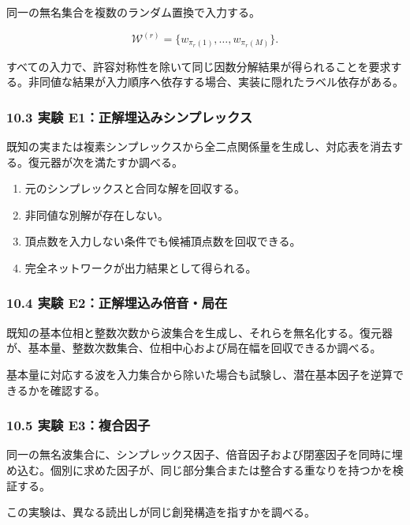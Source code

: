 \documentclass[
  a4paper,
]{ltjsarticle}
\providecommand{\tightlist}{%
  \setlength{\itemsep}{0pt}\setlength{\parskip}{0pt}}
\begin{document}
同一の無名集合を複数のランダム置換で入力する。

\[
\mathcal W^{(r)}
=
\{w_{\pi_r(1)},\ldots,w_{\pi_r(M)}\}.
\]

すべての入力で、許容対称性を除いて同じ因数分解結果が得られることを要求する。非同値な結果が入力順序へ依存する場合、実装に隠れたラベル依存がある。

\subsubsection{10.3 実験
E1：正解埋込みシンプレックス}\label{ux5b9fux9a13-e1ux6b63ux89e3ux57cbux8fbcux307fux30b7ux30f3ux30d7ux30ecux30c3ux30afux30b9}

既知の実または複素シンプレックスから全二点関係量を生成し、対応表を消去する。復元器が次を満たすか調べる。

\begin{enumerate}
\def\labelenumi{\arabic{enumi}.}
\tightlist
\item
  元のシンプレックスと合同な解を回収する。
\item
  非同値な別解が存在しない。
\item
  頂点数を入力しない条件でも候補頂点数を回収できる。
\item
  完全ネットワークが出力結果として得られる。
\end{enumerate}

\subsubsection{10.4 実験
E2：正解埋込み倍音・局在}\label{ux5b9fux9a13-e2ux6b63ux89e3ux57cbux8fbcux307fux500dux97f3ux5c40ux5728}

既知の基本位相と整数次数から波集合を生成し、それらを無名化する。復元器が、基本量、整数次数集合、位相中心および局在幅を回収できるか調べる。

基本量に対応する波を入力集合から除いた場合も試験し、潜在基本因子を逆算できるかを確認する。

\subsubsection{10.5 実験
E3：複合因子}\label{ux5b9fux9a13-e3ux8907ux5408ux56e0ux5b50}

同一の無名波集合に、シンプレックス因子、倍音因子および閉塞因子を同時に埋め込む。個別に求めた因子が、同じ部分集合または整合する重なりを持つかを検証する。

この実験は、異なる読出しが同じ創発構造を指すかを調べる。
\end{document}

